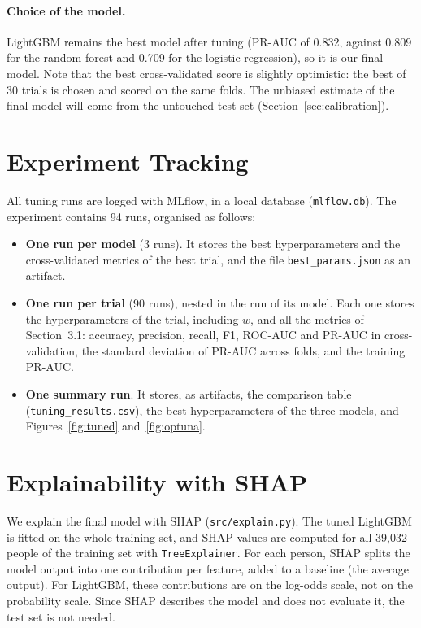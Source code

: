 \documentclass[10pt,a4paper]{article}
\begin{document}
\paragraph{Choice of the model.}
LightGBM remains the best model after tuning (PR-AUC of 0.832, against 0.809 for the
random forest and 0.709 for the logistic regression), so it is our final model. Note that the best cross-validated score is
slightly optimistic: the best of 30 trials is chosen and scored on the same folds. The 
unbiased estimate of the final model will come from the untouched test set
(Section~\ref{sec:calibration}).

\section{Experiment Tracking}
\label{sec:tracking}
All tuning runs are logged with MLflow, in a local database (\texttt{mlflow.db}). The
experiment contains 94 runs, organised as follows:
\begin{itemize}
\item \textbf{One run per model} (3 runs). It stores the best hyperparameters and the
cross-validated metrics of the best trial, and the file \texttt{best\_params.json} as an
artifact.
\item \textbf{One run per trial} (90 runs), nested in the run of its model. Each one
stores the hyperparameters of the trial, including $w$, and all the metrics of
Section~3.1: accuracy, precision, recall, F1, ROC-AUC and PR-AUC in cross-validation, the standard
deviation of PR-AUC across folds, and the training PR-AUC.
\item \textbf{One summary run}. It stores, as artifacts, the comparison table
(\texttt{tuning\_results.csv}), the best hyperparameters of the three models, and
Figures~\ref{fig:tuned} and~\ref{fig:optuna}.
\end{itemize}

\section{Explainability with SHAP}
\label{sec:shap}
We explain the final model with SHAP (\texttt{src/explain.py}). The tuned LightGBM is
fitted on the whole training set, and SHAP values are computed for all 39,032 people of
the training set with \texttt{TreeExplainer}. For each person, SHAP splits the model
output into one contribution per feature, added to a baseline (the average output). For
LightGBM, these contributions are on the log-odds scale, not on the probability scale.
Since SHAP describes the model and does not evaluate it, the test set is not needed.
\end{document}
